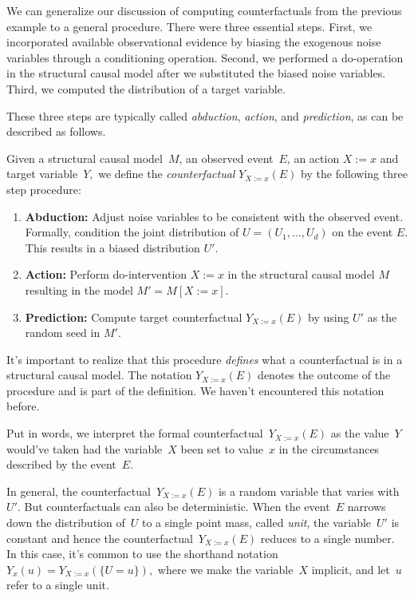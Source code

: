 \documentclass{tufte-book}
\begin{document}
We can generalize our discussion of computing counterfactuals from the
previous example to a general procedure. There were three essential
steps. First, we incorporated available observational evidence by
biasing the exogenous noise variables through a conditioning operation.
Second, we performed a do-operation in the structural causal model after
we substituted the biased noise variables. Third, we computed the
distribution of a target variable.

These three steps are typically called \emph{abduction}, \emph{action},
and \emph{prediction}, as can be described as follows.

\begin{Definition}

Given a structural causal model~\(M\), an observed event~\(E\), an
action \(X:= x\) and target variable~\(Y,\) we define the
\emph{counterfactual} \(Y_{X:=x}(E)\) by the following three step
procedure:

\begin{enumerate}
\def\labelenumi{\arabic{enumi}.}
\tightlist
\item
  \textbf{Abduction:} Adjust noise variables to be consistent with the
  observed event. Formally, condition the joint distribution of
  \(U=(U_1,...,U_d)\) on the event \(E\). This results in a biased
  distribution \(U'\).
\item
  \textbf{Action:} Perform do-intervention \(X:=x\) in the structural
  causal model \(M\) resulting in the model \(M'=M[X:=x].\)
\item
  \textbf{Prediction:} Compute target counterfactual \(Y_{X:=x}(E)\) by
  using \(U'\) as the random seed in \(M'.\)
\end{enumerate}

\end{Definition}

It's important to realize that this procedure \emph{defines} what a
counterfactual is in a structural causal model. The notation
\(Y_{X:=x}(E)\) denotes the outcome of the procedure and is part of the
definition. We haven't encountered this notation before.

Put in words, we interpret the formal counterfactual~\(Y_{X:=x}(E)\) as
the value~\(Y\) would've taken had the variable~\(X\) been set to
value~\(x\) in the circumstances described by the event~\(E\).

In general, the counterfactual~\(Y_{X:=x}(E)\) is a random variable that
varies with~\(U'\). But counterfactuals can also be deterministic. When
the event~\(E\) narrows down the distribution of~\(U\) to a single point
mass, called \emph{unit}, the variable~\(U'\) is constant and hence the
counterfactual~\(Y_{X:=x}(E)\) reduces to a single number. In this case,
it's common to use the shorthand
notation~\(Y_{x}(u)=Y_{X:=x}(\{U=u\}),\) where we make the
variable~\(X\) implicit, and let~\(u\) refer to a single unit.
\end{document}
